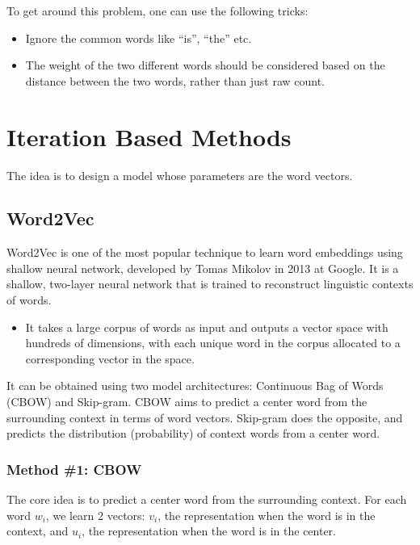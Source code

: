 \documentclass[
]{book}
\providecommand{\tightlist}{%
  \setlength{\itemsep}{0pt}\setlength{\parskip}{0pt}}
\begin{document}
To get around this problem, one can use the following tricks:

\begin{itemize}
\tightlist
\item
  Ignore the common words like ``is'', ``the'' etc.
\item
  The weight of the two different words should be considered based on the distance between the two words, rather than just raw count.
\end{itemize}

\hypertarget{iteration-based-methods}{%
\section{Iteration Based Methods}\label{iteration-based-methods}}

The idea is to design a model whose parameters are the word vectors.

\hypertarget{word2vec}{%
\subsection{Word2Vec}\label{word2vec}}

Word2Vec is one of the most popular technique to learn word embeddings using shallow neural network, developed by Tomas Mikolov in 2013 at Google. It is a shallow, two-layer neural network that is trained to reconstruct linguistic contexts of words.

\begin{itemize}
\tightlist
\item
  It takes a large corpus of words as input and outputs a vector space with hundreds of dimensions, with each unique word in the corpus allocated to a corresponding vector in the space.
\end{itemize}

It can be obtained using two model architectures: Continuous Bag of Words (CBOW) and Skip-gram. CBOW aims to predict a center word from the surrounding context in terms of word vectors. Skip-gram does the opposite, and predicts the distribution (probability) of context words from a center word.

\hypertarget{method-1-cbow}{%
\subsubsection{Method \#1: CBOW}\label{method-1-cbow}}

The core idea is to predict a center word from the surrounding context. For each word \(w_i\), we learn 2 vectors: \(v_i\), the representation when the word is in the context, and \(u_i\), the representation when the word is in the center.
\end{document}
